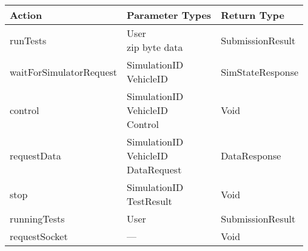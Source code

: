 \def\tabularxcolumn#1{m{#1}}
\begin{tabularx}{.75\linewidth}{X l l}
    \toprule
    \bfseries Action & \bfseries Parameter Types & \bfseries Return Type \\
    \midrule
    runTests & \makecell[l]{User\\zip byte data} & SubmissionResult \\
    \midrule
    waitForSimulatorRequest & \makecell[l]{SimulationID\\VehicleID} & SimStateResponse \\
    \midrule
    control & \makecell[l]{SimulationID\\VehicleID\\Control} & Void \\
    \midrule
    requestData & \makecell[l]{SimulationID\\VehicleID\\DataRequest} & DataResponse \\
    \midrule
    stop & \makecell[l]{SimulationID\\TestResult} & Void \\
    \midrule
    runningTests & User & SubmissionResult \\
    \midrule
    requestSocket & --- & Void \\
    \bottomrule
\end{tabularx}
